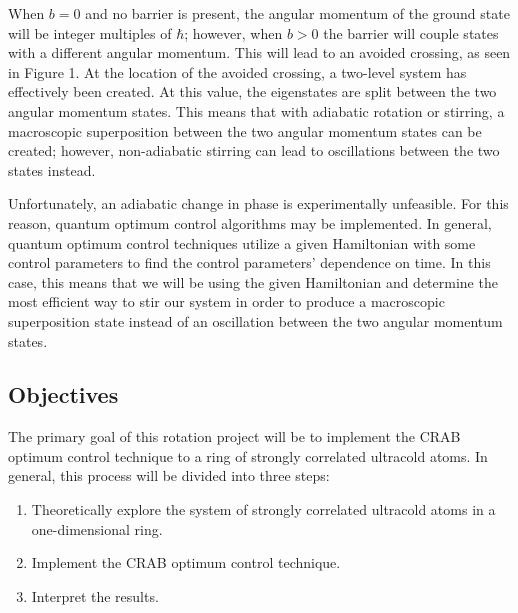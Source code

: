 \documentclass[fontsize=10pt, twocolumn]{scrartcl}	 %
\begin{document}
When $b = 0$ and no barrier is present, the angular momentum of the ground state will be integer multiples of $\hbar$; however, when $b > 0$ the barrier will couple states with a different angular momentum. This will lead to an avoided crossing, as seen in Figure 1\cite{CROSSING}. At the location of the avoided crossing, a two-level system has effectively been created. At this value, the eigenstates are split between the two angular momentum states. This means that with adiabatic rotation or stirring, a macroscopic superposition between the two angular momentum states can be created; however, non-adiabatic stirring can lead to oscillations between the two states instead\cite{CROSSING}. 

Unfortunately, an adiabatic change in phase is experimentally unfeasible. For this reason, quantum optimum control algorithms may be implemented. In general, quantum optimum control techniques utilize a given Hamiltonian with some control parameters to find the control parameters' dependence on time. In this case, this means that we will be using the given Hamiltonian and determine the most efficient way to stir our system in order to produce a macroscopic superposition state instead of an oscillation between the two angular momentum states.


\subsection*{Objectives}

The primary goal of this rotation project will be to implement the CRAB optimum control technique to a ring of strongly correlated ultracold atoms. In general, this process will be divided into three steps:
\begin{enumerate}
\item Theoretically explore the system of strongly correlated ultracold atoms in a one-dimensional ring.\vspace*{-8pt}
\item Implement the CRAB optimum control technique.\vspace*{-8pt}
\item Interpret the results.\vspace*{-8pt}
\end{enumerate}
\end{document}
